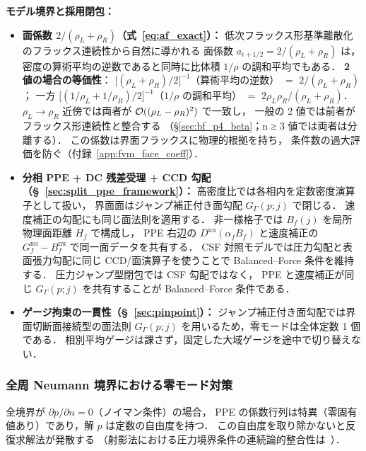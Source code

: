 \noindent\textbf{モデル境界と採用閉包：}
\begin{itemize}
  \item \textbf{面係数 $2/(\rho_L+\rho_R)$（式~\eqref{eq:af_exact}）：}
        低次フラックス形基準離散化のフラックス連続性から自然に導かれる
        面係数 $a_{i+1/2} = 2/(\rho_L+\rho_R)$ は，
        密度の算術平均の逆数であると同時に比体積 $1/\rho$ の調和平均でもある．
        \textbf{2 値の場合の等価性}：
        $\bigl[(\rho_L+\rho_R)/2\bigr]^{-1}$（算術平均の逆数）
        $=$ $2/(\rho_L+\rho_R)$；
        一方 $\bigl[(1/\rho_L+1/\rho_R)/2\bigr]^{-1}$（$1/\rho$ の調和平均）
        $=$ $2\rho_L\rho_R/(\rho_L+\rho_R)$．
        $\rho_L \to \rho_R$ 近傍では両者が $\mathcal{O}((\rho_L-\rho_R)^2)$ で一致し，
        一般の 2 値では前者がフラックス形連続性と整合する
        （§\ref{sec:bf_p4_beta}；n ≥ 3 値では両者は分離する）．
        この係数は界面フラックスに物理的根拠を持ち，
        条件数の過大評価を防ぐ（付録~\ref{app:fvm_face_coeff}）．
  \item \textbf{分相 PPE + DC 残差受理 + CCD 勾配（§~\ref{sec:split_ppe_framework}）：}
        高密度比では各相内を定数密度演算子として扱い，
        界面面はジャンプ補正付き面勾配 $G_\Gamma(p;j)$ で閉じる．
        速度補正の勾配にも同じ面法則を適用する．
        非一様格子では $B_f(j)$ を局所物理面距離 $H_f$ で構成し，
        PPE 右辺の $D^{\mathrm{nu}}(\alpha_fB_f)$ と速度補正の
        $G_f^{\mathrm{nu}}-B_f^{\mathrm{nu}}$ で同一面データを共有する．
        CSF 対照モデルでは圧力勾配と表面張力勾配に同じ CCD/面演算子を使うことで
        Balanced--Force 条件を維持する．
        圧力ジャンプ型閉包では CSF 勾配ではなく，
        PPE と速度補正が同じ $G_\Gamma(p;j)$ を共有することが Balanced--Force 条件である．
  \item \textbf{ゲージ拘束の一貫性（§~\ref{sec:pinpoint}）：}
        ジャンプ補正付き面勾配では界面切断面接続型の面法則
        $G_\Gamma(p;j)$ を用いるため，零モードは全体定数 1 個である．
        相別平均ゲージは課さず，固定した大域ゲージを途中で切り替えない．

\end{itemize}

\subsubsection{全周 Neumann 境界における零モード対策}
\label{sec:ppe_zero_mode}

全境界が $\partial p/\partial n = 0$（ノイマン条件）の場合，
PPE の係数行列は特異（零固有値あり）であり，解 $p$ は定数の自由度を持つ．
この自由度を取り除かないと反復求解法が発散する
（射影法における圧力境界条件の連続論的整合性は~\cite{PyoShen2007}）．

